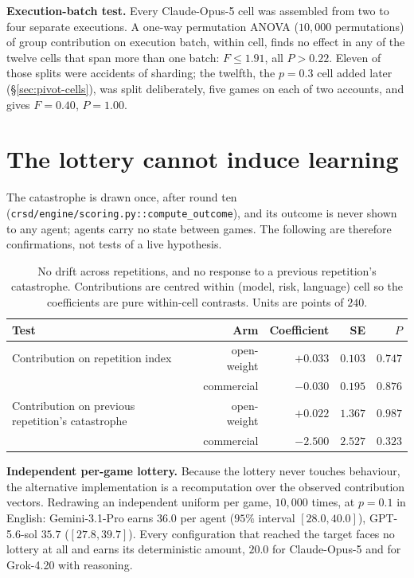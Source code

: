 \documentclass[11pt,a4paper]{article}
\begin{document}
\smallskip
\noindent \textbf{Execution-batch test.} Every Claude-Opus-5 cell was assembled from two
to four separate executions. A one-way permutation ANOVA ($10{,}000$ permutations) of
group contribution on execution batch, within cell, finds no effect in any of the twelve
cells that span more than one batch: $F \le 1.91$, all $P > 0.22$. Eleven of those splits
were accidents of sharding; the twelfth, the $p=0.3$ cell added later
(\S\ref{sec:pivot-cells}), was split deliberately, five games on each of two accounts,
and gives $F=0.40$, $P=1.00$.

\section{The lottery cannot induce learning}
\label{sec:lottery}

The catastrophe is drawn once, after round ten
(\texttt{crsd/engine/scoring.py::compute\_outcome}), and its outcome is never shown to
any agent; agents carry no state between games. The following are therefore
confirmations, not tests of a live hypothesis.

\begin{table}[h]
\centering
\caption{No drift across repetitions, and no response to a previous repetition's
catastrophe. Contributions are centred within (model, risk, language) cell so the
coefficients are pure within-cell contrasts. Units are points of $240$.}
\begin{tabular}{@{}lrrrr@{}}
\toprule
Test & Arm & Coefficient & SE & $P$ \\
\midrule
Contribution on repetition index & open-weight & $+0.033$ & $0.103$ & $0.747$ \\
                                 & commercial  & $-0.030$ & $0.195$ & $0.876$ \\
Contribution on previous repetition's catastrophe & open-weight & $+0.022$ & $1.367$ & $0.987$ \\
                                 & commercial  & $-2.500$ & $2.527$ & $0.323$ \\
\bottomrule
\end{tabular}
\end{table}

\noindent \textbf{Independent per-game lottery.} Because the lottery never touches
behaviour, the alternative implementation is a recomputation over the observed
contribution vectors. Redrawing an independent uniform per game, $10{,}000$ times, at
$p=0.1$ in English: Gemini-3.1-Pro earns $36.0$ per agent ($95\%$ interval
$[28.0,40.0]$), GPT-5.6-sol $35.7$ ($[27.8,39.7]$). Every configuration that reached the
target faces no lottery at all and earns its deterministic amount, $20.0$ for
Claude-Opus-5 and for Grok-4.20 with reasoning.
\end{document}
